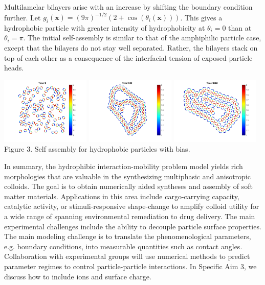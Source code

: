 Multilamelar bilayers arise with an increase by shifting the boundary condition
further. Let $g_i(\mathbf{x}) = (9\pi )^{-1/2}(2 + \cos(\theta_i(\mathbf{x})))$.
This gives a hydrophobic particle with greater intensity of hydrophobicity
at $\theta_i = 0$ than at $\theta_i = \pi$.  The initial self-assembly
is similar to that of the amphiphilic particle case, except that the bilayers
do not stay well separated.  Rather, the bilayers stack on top of each
other as a consequence of the interfacial tension of exposed particle heads. 
\begin{center}
    \includegraphics[width=0.32\textwidth]{figures/SpecificAim1/N100_C1.png}
    \includegraphics[width=0.32\textwidth]{figures/SpecificAim1/N100_C2.png}
    \includegraphics[width=0.32\textwidth]{figures/SpecificAim1/N100_C4.png}\\
    Figure 3. Self assembly for hydrophobic particles with bias.
    \label{fig:self-assemblyA}
\end{center}

In summary, the hydrophibic interaction-mobility problem model yields
rich morphologies that are valuable in the synthesizing multiphasic and
anisotropic colloids. The goal is to obtain numerically aided 
syntheses and assembly of soft matter materials.
Applications in this area include cargo-carrying capacity, 
catalytic activity, or stimuli-responsive shape-change to amplify colloid
utility for a wide range of  spanning environmental remediation to drug
delivery. The main experimental challenges include the ability to
decouple particle surface properties.
The main modeling challenge is to translate the phenomenological
parameters, e.g. boundary conditions, into measurable quantities
such as contact angles. Collaboration with experimental groups will
use numerical methods to predict parameter regimes 
to control particle-particle interactions. In Specific Aim 3, we
discuss how to include ions and surface charge. 

